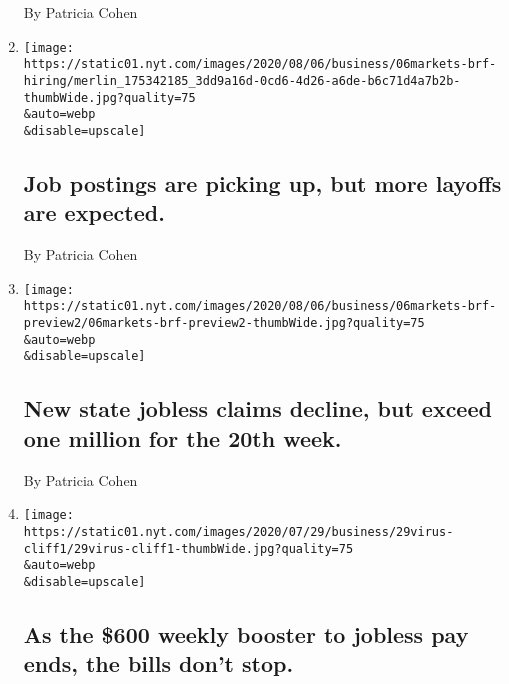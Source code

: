 \begin{enumerate}
  By Patricia Cohen
\item
  \href{/live/2020/08/06/business/stock-market-today-coronavirus/job-postings-are-picking-up-but-more-layoffs-are-expected}{}

  \texttt{[image: https://static01.nyt.com/images/2020/08/06/business/06markets-brf-hiring/merlin\_175342185\_3dd9a16d-0cd6-4d26-a6de-b6c71d4a7b2b-thumbWide.jpg?quality=75\\\&auto=webp\\\&disable=upscale]}

  \hypertarget{job-postings-are-picking-up-but-more-layoffs-are-expected}{%
  \subsection{Job postings are picking up, but more layoffs are
  expected.}\label{job-postings-are-picking-up-but-more-layoffs-are-expected}}

  By Patricia Cohen
\item
  \href{/live/2020/08/06/business/stock-market-today-coronavirus/new-state-jobless-claims-decline-but-exceed-one-million-for-the-20th-week}{}

  \texttt{[image: https://static01.nyt.com/images/2020/08/06/business/06markets-brf-preview2/06markets-brf-preview2-thumbWide.jpg?quality=75\\\&auto=webp\\\&disable=upscale]}

  \hypertarget{new-state-jobless-claims-decline-but-exceed-one-million-for-the-20th-week}{%
  \subsection{New state jobless claims decline, but exceed one million
  for the 20th
  week.}\label{new-state-jobless-claims-decline-but-exceed-one-million-for-the-20th-week}}

  By Patricia Cohen
\item
  \href{/live/2020/07/29/business/stock-market-today-coronavirus/as-the-600-weekly-booster-to-jobless-pay-ends-the-bills-dont-stop}{}

  \texttt{[image: https://static01.nyt.com/images/2020/07/29/business/29virus-cliff1/29virus-cliff1-thumbWide.jpg?quality=75\\\&auto=webp\\\&disable=upscale]}

  \hypertarget{as-the-600-weekly-booster-to-jobless-pay-ends-the-bills-dont-stop}{%
  \subsection{As the \$600 weekly booster to jobless pay ends, the bills
  don't
  stop.}\label{as-the-600-weekly-booster-to-jobless-pay-ends-the-bills-dont-stop}}


\end{enumerate}
